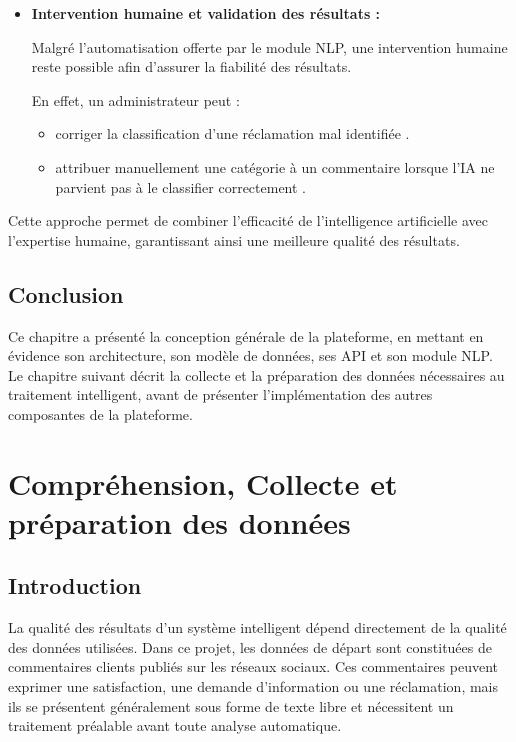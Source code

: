 \documentclass[12pt,a4paper,oneside]{report}
\begin{document}
\begin{itemize}
    \item \textbf{Intervention humaine et validation des résultats :}


    Malgré l’automatisation offerte par le module NLP, une intervention humaine reste possible afin d’assurer la fiabilité des résultats.
    
    En effet, un administrateur peut :
    
    \begin{itemize}
        \item corriger la classification d’une réclamation mal identifiée .
        \item attribuer manuellement une catégorie à un commentaire lorsque l’IA ne parvient pas à le classifier correctement .
    \end{itemize}
\end{itemize}
Cette approche permet de combiner l’efficacité de l’intelligence artificielle avec l’expertise humaine, garantissant ainsi une meilleure qualité des résultats.

\section{Conclusion}
Ce chapitre a présenté la conception générale de la plateforme, en mettant en évidence son architecture, son modèle de données, ses API et son module NLP. Le chapitre suivant décrit la collecte et la préparation des données nécessaires au traitement intelligent, avant de présenter l’implémentation des autres composantes de la plateforme.

\chapter{Compréhension, Collecte et préparation des données}

\section{Introduction}

La qualité des résultats d’un système intelligent dépend directement de la qualité des données utilisées. Dans ce projet, les données de départ sont constituées de commentaires clients publiés sur les réseaux sociaux. Ces commentaires peuvent exprimer une satisfaction, une demande d’information ou une réclamation, mais ils se présentent généralement sous forme de texte libre et nécessitent un traitement préalable avant toute analyse automatique.
\end{document}
